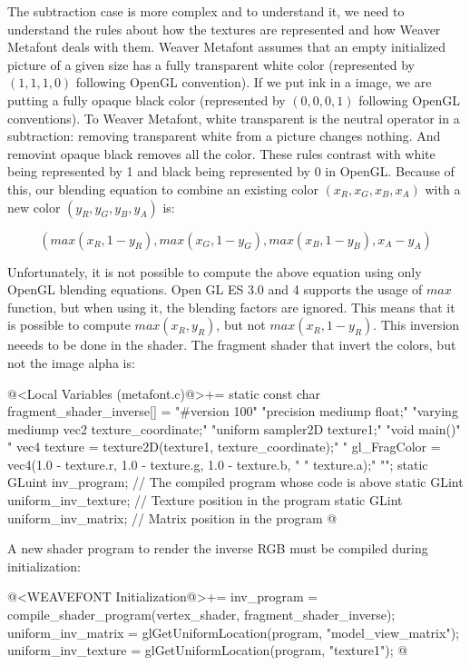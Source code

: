 {{{{{The subtraction case is more complex and to understand it, we need to
understand the rules about how the textures are represented and how
Weaver Metafont deals with them. Weaver Metafont assumes that an empty
initialized picture of a given size has a fully transparent white
color (represented by $(1, 1, 1 ,0)$ following OpenGL convention). If
we put ink in a image, we are putting a fully opaque black color
(represented by $(0, 0, 0, 1)$ following OpenGL conventions). To
Weaver Metafont, white transparent is the neutral operator in a
subtraction: removing transparent white from a picture changes
nothing. And removint opaque black removes all the color. These rules
contrast with white being represented by 1 and black being represented
by 0 in OpenGL. Because of this, our blending equation to combine an
existing color $(x_R, x_G, x_B, x_A)$ with a new color $(y_R, y_G,
y_B, y_A)$ is:

$$
(max(x_R, 1-y_R), max(x_G, 1-y_G), max(x_B, 1-y_B), x_A-y_A)
$$

Unfortunately, it is not possible to compute the above equation using
only OpenGL blending equations. Open GL ES 3.0 and 4 supports the
usage of $max$ function, but when using it, the blending factors are
ignored. This means that it is possible to compute $max(x_R, y_R)$,
but not $max(x_R, 1- y_R)$. This inversion neeeds to be done in the
shader. The fragment shader that invert the colors, but not the image
alpha is:

\iniciocodigo
@<Local Variables (metafont.c)@>+=
static const char fragment_shader_inverse[] =
  "#version 100\n"
  "precision mediump float;\n"
  "varying mediump vec2 texture_coordinate;\n"
  "uniform sampler2D texture1;\n"
  "void main(){\n"
  "  vec4 texture = texture2D(texture1, texture_coordinate);\n"
  "  gl_FragColor = vec4(1.0 - texture.r, 1.0 - texture.g, 1.0 - texture.b, \n"
  "                      texture.a);\n"
  "}\n";
static GLuint inv_program; // The compiled program whose code is above
static GLint uniform_inv_texture; // Texture position in the program
static GLint uniform_inv_matrix; // Matrix position in the program
@
\fimcodigo

A new shader program to render the inverse RGB must be compiled during
initialization:

\iniciocodigo
@<WEAVEFONT Initialization@>+=
{
  inv_program = compile_shader_program(vertex_shader, fragment_shader_inverse);
  uniform_inv_matrix = glGetUniformLocation(program, "model_view_matrix");
  uniform_inv_texture = glGetUniformLocation(program, "texture1");
}
@
\fimcodigo

}}}}}
